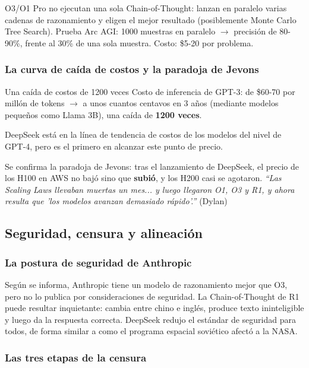 O3/O1 Pro no ejecutan una sola Chain-of-Thought: lanzan en paralelo varias cadenas de razonamiento y eligen el mejor resultado (posiblemente Monte Carlo Tree Search). Prueba Arc AGI: 1000 muestras en paralelo $\to$ precisión de 80-90\%, frente al 30\% de una sola muestra. Costo: \$5-20 por problema.

\subsubsection{La curva de caída de costos y la paradoja de Jevons}

\begin{importantbox}{Una caída de costos de 1200 veces}
Costo de inferencia de GPT-3: de \$60-70 por millón de tokens $\to$ a unos cuantos centavos en 3 años (mediante modelos pequeños como Llama 3B), una caída de \textbf{1200 veces}.

DeepSeek está en la línea de tendencia de costos de los modelos del nivel de GPT-4, pero es el primero en alcanzar este punto de precio.

Se confirma la paradoja de Jevons: tras el lanzamiento de DeepSeek, el precio de los H100 en AWS no bajó sino que \textbf{subió}, y los H200 casi se agotaron. \textit{``Las Scaling Laws llevaban muertas un mes... y luego llegaron O1, O3 y R1, y ahora resulta que 'los modelos avanzan demasiado rápido'.''} (Dylan)
\end{importantbox}

\subsection{Seguridad, censura y alineación}

\subsubsection{La postura de seguridad de Anthropic}

Según se informa, Anthropic tiene un modelo de razonamiento mejor que O3, pero no lo publica por consideraciones de seguridad. La Chain-of-Thought de R1 puede resultar inquietante: cambia entre chino e inglés, produce texto ininteligible y luego da la respuesta correcta. DeepSeek redujo el estándar de seguridad para todos, de forma similar a como el programa espacial soviético afectó a la NASA.

\subsubsection{Las tres etapas de la censura}

